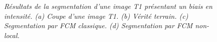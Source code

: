 \begin{figure}[!thbp]

        \begin{center}
        \end{center}

        \caption{\emph{Résultats de la segmentation d'une image T1 présentant un biais en intensité. (a) Coupe d'une image T1. (b) Vérité terrain. (c) Segmentation par FCM classique. (d) Segmentation par FCM non-local.}}

        \label{FIG:VIEW:BRAINWEB:BIAS}

\end{figure}

